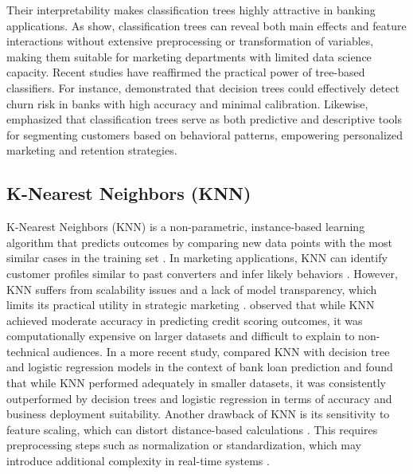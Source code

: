 \documentclass[12pt]{article}
\begin{document}
Their interpretability makes classification trees highly attractive in banking applications. As \cite{DeCaigny2024HybridAnalysis} show, classification trees can reveal both main effects and feature interactions without extensive preprocessing or transformation of variables, making them suitable for marketing departments with limited data science capacity. Recent studies have reaffirmed the practical power of tree-based classifiers. For instance, \cite{Vaduva2024ImprovingTechniques} demonstrated that decision trees could effectively detect churn risk in banks with high accuracy and minimal calibration. Likewise, \cite{Joung2023InterpretableReviews} emphasized that classification trees serve as both predictive and descriptive tools for segmenting customers based on behavioral patterns, empowering personalized marketing and retention strategies.

\subsection{K-Nearest Neighbors (KNN)}
K-Nearest Neighbors (KNN) is a non-parametric, instance-based learning algorithm that predicts outcomes by comparing new data points with the most similar cases in the training set \citep{Joung2023InterpretableReviews}. In marketing applications, KNN can identify customer profiles similar to past converters and infer likely behaviors \citep{Zaki2024PredictiveSubscriptions}. However, KNN suffers from scalability issues and a lack of model transparency, which limits its practical utility in strategic marketing \citep{Murugan2023Large-scaleStrategies}.
\cite{Alborzi2016UsingMethod} observed that while KNN achieved moderate accuracy in predicting credit scoring outcomes, it was computationally expensive on larger datasets and difficult to explain to non-technical audiences. In a more recent study, \cite{Kruthika2024ComparativeSector} compared KNN with decision tree and logistic regression models in the context of bank loan prediction and found that while KNN performed adequately in smaller datasets, it was consistently outperformed by decision trees and logistic regression in terms of accuracy and business deployment suitability.
Another drawback of KNN is its sensitivity to feature scaling, which can distort distance-based calculations \citep{HusseinSayed2024MachineBalancing}. This requires preprocessing steps such as normalization or standardization, which may introduce additional complexity in real-time systems \citep{Ahsan2021EffectPerformance}.
\end{document}
